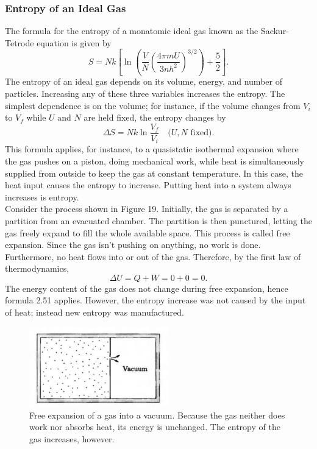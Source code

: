 \documentclass[11pt]{exam}
\begin{document}
\subsubsection*{Entropy of an Ideal Gas}
The formula for the entropy of a monatomic ideal gas known as the Sackur-Tetrode equation is given by
\begin{equation}\tag{2.49}
S=Nk\left[\ln{\left(\frac{V}{N}\left(\frac{4\pi mU}{3nh^2}\right)^{3/2}\right)}+\frac{5}{2}\right].
\end{equation}
\hspace*{10mm}The entropy of an ideal gas depends on its volume, energy, and number of particles. Increasing any of these three variables increases the entropy. The simplest dependence is on the volume; for instance, if the volume changes from $V_i$ to $V_f$ while $U$ and $N$ are held fixed, the entropy changes by 
\begin{equation}
\Delta S = Nk\ln{\frac{V_f}{V_i}}\quad\text{($U, N$ fixed).}
\end{equation}
This formula applies, for instance, to a quasistatic isothermal expansion where the gas pushes on a piston, doing mechanical work, while heat is simultaneously supplied from outside to keep the gas at constant temperature. In this case, the heat input causes the entropy to increase. Putting heat into a system always increases is entropy.\\
\hspace*{10mm}Consider the process shown in Figure 19. Initially, the gas is separated by a partition from an evacuated chamber. The partition is then punctured, letting the gas freely expand to fill the whole available space. This process is called free expansion. Since the gas isn't pushing on anything, no work is done. Furthermore, no heat flows into or out of the gas. Therefore, by the first law of thermodynamics, 
\begin{equation}\tag{2.52}
\Delta U=Q+W=0+0=0.    
\end{equation}
The energy content of the gas does not change during free expansion, hence formula 2.51 applies. However, the entropy increase was not caused by the input of heat; instead new entropy was manufactured. 
\begin{figure}[htp]
    \centering
    \includegraphics[width=6cm]{figure19.png}
    \caption{Free expansion of a gas into a vacuum. Because the gas neither does work nor absorbs heat, its energy is unchanged. The entropy of the gas increases, however.}
\label{fig:momentum-space-volume}
\end{figure}\\
\newpage
\end{document}
